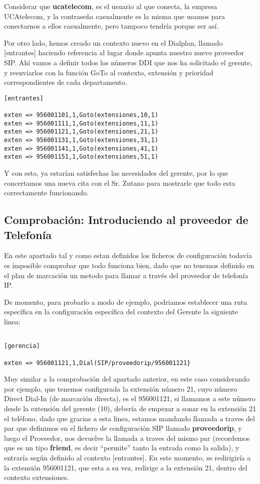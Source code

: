 Considerar que \textbf{ucatelecom}, es el usuario al que conecta, la empresa UCAtelecom, y la contraseña casualmente es la misma que usamos para conectarnos a ellos casualmente, pero tampoco tendría porque ser así.

Por otro lado, hemos creado un contexto nuevo en el Dialplan, llamado [entrantes] haciendo referencia al lugar donde apunta nuestro nuevo proveedor SIP. Ahí vamos a definir todos los números DDI que nos ha solicitado el gerente, y reenviarlos con la función GoTo al contexto, extensión y prioridad correspondientes de cada departamento.

\begin{lstlisting}[style=bash,title={/etc/asterisk/extensions.conf}]
[entrantes]

exten => 956001101,1,Goto(extensiones,10,1)
exten => 956001111,1,Goto(extensiones,11,1)
exten => 956001121,1,Goto(extensiones,21,1)
exten => 956001131,1,Goto(extensiones,31,1)
exten => 956001141,1,Goto(extensiones,41,1)
exten => 956001151,1,Goto(extensiones,51,1)
\end{lstlisting}

Y con esto, ya estarían satisfechas las necesidades del gerente, por lo que concertamos una nueva cita con el Sr. Zutano para mostrarle que todo esta correctamente funcionando.

\subsection{Comprobación: Introduciendo al proveedor de Telefonía}

En este apartado tal y como estan definidos los ficheros de configuración todavía es imposible comprobar que todo funciona bien, dado que no tenemos definido en el plan de marcación un metodo para llamar a través del proveedor de telefonía IP. 

De momento, para probarlo a modo de ejemplo, podriamos establecer una ruta específica en la configuración específica del contexto del Gerente la siguiente linea:

\begin{lstlisting}[style=bash,title={/etc/asterisk/extensions.conf}]

[gerencia]

exten => 956001121,1,Dial(SIP/proveedorip/956001121}

\end{lstlisting}

Muy similar a la comprobación del apartado anterior, en este caso considerando por ejemplo, que tenemos configurada la extensión número 21, cuyo número Direct Dial-In (de marcación directa), es el 956001121, si llamamos a este número desde la extensión del gerente (10), debería de empezar a sonar en la extensión 21 el teléfono, dado que gracias a esta linea, estamos mandando llamada a traves del par que definimos en el fichero de configuración SIP llamado \textbf{proveedorip}, y luego el Proveedor, nos devuelve la llamada a traves del mismo par (recordemos que es un tipo \textbf{friend}, es decir ``permite'' tanto la entrada como la salida), y entraría según definido al contexto [entrantes]. En este momento, se redirigiría a la extensión 956001121, que esta a su vez, redirige a la extensión 21, dentro del contexto extensiones.
